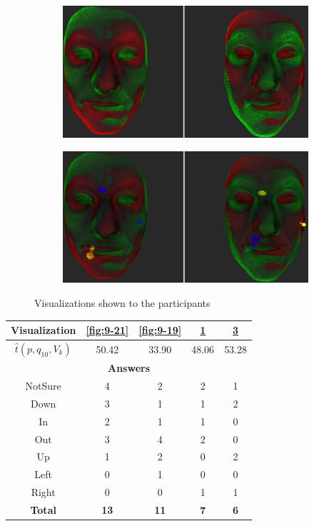 \begin{figure}[h]
\begin{subfigure}{0.4\textwidth}
\includegraphics[width=\textwidth]{./screenshots/pair20.PNG}
\caption{}
\label{fig:9-20}
\end{subfigure}
\quad
\begin{subfigure}{0.4\textwidth}
\includegraphics[width=\textwidth]{./screenshots/pair24.PNG}
\caption{}
\label{fig:9-24}
\end{subfigure}
\caption{Visualizations shown to the participants}
\end{figure}
\medskip

\begin{center}
\begin{tabular}{| c | c | c | c | c |}
	\hline
	Visualization & \ref{fig:9-21} & \ref{fig:9-19} & \ref{fig:9-20} & \ref{fig:9-24}\\ \hline
	\(\widehat{t}(p, q_10, V_k)\) & 50.42 & 33.90 & 48.06 & 53.28\\ \hline
	\multicolumn{5}{|c|}{\bf Answers} \\ \hline
	NotSure & 4 & 2 & 2 & 1\\ \hline
	Down & 3 & 1 & 1 & 2\\ \hline
	In & 2 & 1 & 1 & 0\\ \hline
	Out & 3 & 4 & 2 & 0\\ \hline
	Up & 1 & 2 & 0 & 2\\ \hline
	Left & 0 & 1 & 0 & 0\\ \hline
	Right & 0 & 0 & 1 & 1\\ \hline
	{\bf Total} & {\bf 13} & {\bf 11} & {\bf 7} & {\bf 6}\\ \hline
\end{tabular}
\end{center}
\clearpage

